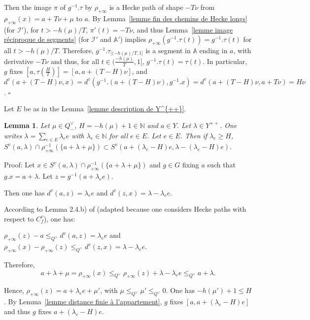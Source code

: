 \documentclass[12pt]{article}
\theoremstyle{plain}
\newtheorem{lemme}[thm]{Lemma}
\theoremstyle{definition}
\newcommand{\A}{\mathbb{A}}
\newcommand{\N}{\mathbb{N}}
\newcommand{\I}{\mathcal{I}}
\begin{document}
Then the image $\pi$ of $g^{-1}.\tau$ by $\rho_{+\infty}$ is a Hecke path of shape $-T\nu$ from $\rho_{+\infty}(x)=a+T\nu +\mu$ to $a$. By Lemma~\ref{lemme fin des chemins de Hecke longs} (for $\I'$), for $t>-h(\mu)/T$, $\pi'(t)=-T\nu$, and thus Lemma~\ref{lemme image réciproque de segments} (for $\I'$ and $\A'$) implies $\rho_{+\infty}(g^{-1}.\tau(t))=g^{-1}.\tau(t)$ for all $t>-h(\mu)/T$. Therefore, $g^{-1}.\tau_{|(-h(\mu)/T,1]}$ is a segment in $\A$ ending in $a$, with derivative $-T\nu$ and thus, for all $t\in (\frac{-h(\mu)}{T},1]$, $g^{-1}.\tau(t)=\tau(t)$.
 In particular, $g$ fixes $[a,\tau(\frac{H}{T})]=[a,a+(T-H)\nu]$, and $d^v(a+(T-H)\nu,x)=d^v(g^{-1}.(a+(T-H)\nu),g^{-1}.x)=d^v(a+(T-H)\nu,a+T\nu)=H\nu$. $\square$











\vspace{5mm}

Let $E$ be as in the Lemma~\ref{lemme description de Y^{++}}. 
 
 
\begin{lemme}\label{lemme distance finie à l'appartement bis}
Let $\mu\in Q^\vee_-$, $H=-h(\mu)+1\in \N$ and $a\in Y$. Let $\lambda\in Y^{++}$. One writes $\lambda=\sum_{e\in E}\lambda_e e$ with $\lambda_e\in\N$ for all $e\in E$. Let $e\in E$. Then if $\lambda_e\geq H$, $S^v(a,\lambda)\cap\rho_{+\infty}^{-1}(\{a+\lambda+\mu\})\subset S^v(a+(\lambda_e -H)e,\lambda-(\lambda_e-H)e)$. 
\end{lemme} 

Proof: Let $x\in S^v(a,\lambda)\cap\rho_{+\infty}^{-1}(\{a+\lambda+\mu\})$ and $g\in G$ fixing $a$ such that $g.x=a+\lambda$.  Let $z=g^{-1}(a+\lambda_e e)$.

Then one has $d^v(a,z)=\lambda_e e$ and $d^v(z,x)=\lambda-\lambda_e e$.

According to Lemma 2.4.b) of \cite{gaussent2014spherical} (adapted because one considers Hecke paths with respect to $C^v_f$), one has: 

$\rho_{+\infty}(z)-a\leq_{Q^\vee} d^v(a,z)=\lambda_e e$ and $\rho_{+\infty}(x)-\rho_{+\infty}(z)\leq_{Q^\vee} d^v(z,x)=\lambda-\lambda_e e$.

Therefore, \[a+\lambda+\mu=\rho_{+\infty}(x)\leq_{Q^\vee} \rho_{+\infty}(z)+\lambda-\lambda_e e\leq_{Q^\vee}a+\lambda.\]

Hence, $\rho_{+\infty}(z)=a+\lambda_e e+\mu'$, with $\mu\leq_{Q^\vee}\mu'\leq_{Q^\vee}0$. One has $-h(\mu')+1\leq H$. By Lemma~\ref{lemme distance finie à l'appartement}, $g$ fixes $[a,a+(\lambda_e-H)e]$ and thus $g$ fixes $a+(\lambda_e-H)e$. 
\end{document}
